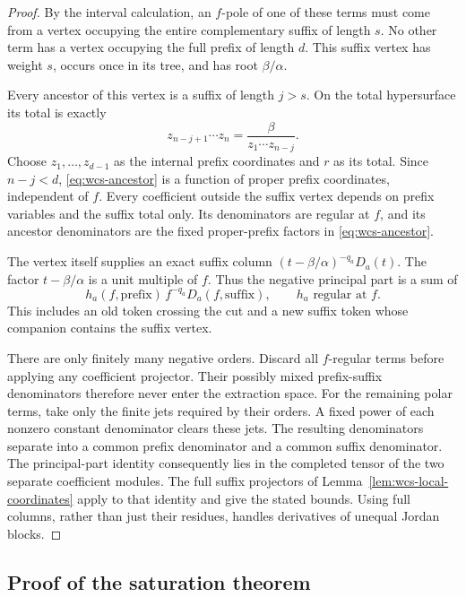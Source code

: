 \begin{proof}
By the interval calculation, an \(f\)-pole of one of these
terms must come from a vertex occupying the entire complementary
suffix of length \(s\).  No other term has a vertex occupying
the full prefix of length \(d\).  This suffix vertex has
weight \(s\), occurs once in its tree, and has root
\(\beta/\alpha\).

Every ancestor of this vertex is a suffix of length \(j>s\).
On the total hypersurface its total is exactly
\begin{equation}\label{eq:wcs-ancestor}
 z_{n-j+1}\cdots z_n
       =\frac{\beta}{z_1\cdots z_{n-j}}.
\end{equation}
Choose \(z_1,\ldots,z_{d-1}\) as the internal prefix
coordinates and \(r\) as its total.  Since \(n-j<d\),
\eqref{eq:wcs-ancestor} is a function of proper prefix
coordinates, independent of \(f\).  Every coefficient
outside the suffix vertex depends on prefix variables
and the suffix total only.  Its denominators are regular
at \(f\), and its ancestor denominators are the fixed
proper-prefix factors in \eqref{eq:wcs-ancestor}.

The vertex itself supplies an exact suffix column
\((t-\beta/\alpha)^{-q_a}D_a(t)\).  The factor
\(t-\beta/\alpha\) is a unit multiple of \(f\).
Thus the negative principal part is a sum of
\[
 h_a(f,\text{prefix})\,f^{-q_a}D_a(f,\text{suffix}),
 \qquad h_a\text{ regular at }f.
\]
This includes an old token crossing the cut and a new suffix
token whose companion contains the suffix vertex.

There are only finitely many negative orders.  Discard all
\(f\)-regular terms before applying any coefficient
projector.  Their possibly mixed prefix-suffix denominators
therefore never enter the extraction space.  For the remaining
polar terms, take only the finite jets required by their
orders.  A fixed power of each nonzero constant denominator
clears these jets.  The resulting denominators separate into
a common prefix denominator and a common suffix denominator.
The principal-part identity consequently lies in the
completed tensor of the two separate coefficient modules.
The full suffix projectors of
Lemma~\ref{lem:wcs-local-coordinates} apply to that identity
and give the stated bounds.  Using full columns, rather
than just their residues, handles derivatives of unequal
Jordan blocks.
\end{proof}

\subsection{Proof of the saturation theorem}


